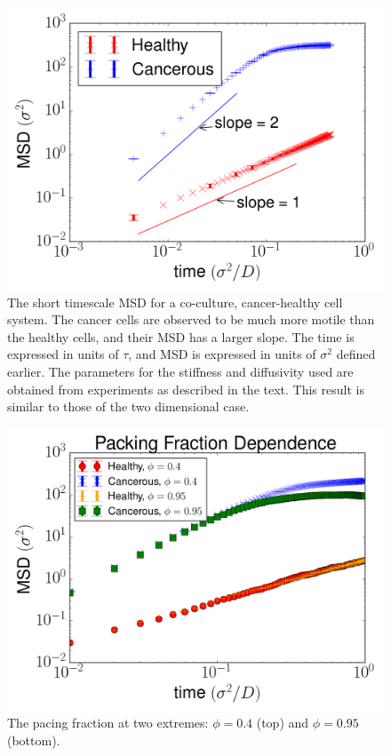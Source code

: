 \documentclass[aps,prb,twocolumn,groupedaddress,nofootinbib,floatfix]{revtex4}
\begin{document}
\begin{figure}
  \includegraphics[width=\columnwidth]{images/cocultureMSD.png}
  \caption[cocultureMSD]
    {The short timescale MSD for a co-culture, cancer-healthy cell system. The cancer cells
    are observed to be much more motile than the healthy cells, and their MSD has a larger slope. The time is expressed in units of $\tau$, and MSD is expressed
    in units of $\sigma^2$ defined earlier. The parameters for the stiffness and diffusivity used are obtained from experiments as described in the text.  This result is
    similar to those of the two dimensional case\cite{Butcher}.}
  \label{fig:cocultureMSD}
\end{figure}

\begin{figure}
  \includegraphics[width=1.0\columnwidth]{images/phi_both.png}
  \caption{The pacing fraction at two extremes: $\phi=0.4$ (top) and $\phi=0.95$ (bottom).}
  \label{fig:phi}
\end{figure}
\end{document}
